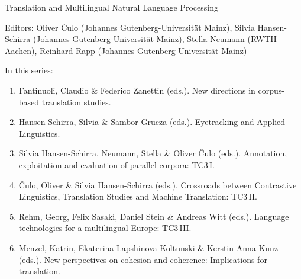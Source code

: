 {\large Translation and Multilingual Natural Language Processing}

\bigskip

Editors: Oliver \v{C}ulo (Johannes Gutenberg-Universität Mainz),
Silvia Hansen-Schirra (Johannes Gutenberg-Universität Mainz), 
Stella Neumann (RWTH Aachen),
Reinhard Rapp (Johannes Gutenberg-Universität Mainz)

\bigskip

In this series:

\begin{enumerate}
\item Fantinuoli, Claudio \& Federico Zanettin (eds.). New directions in corpus-based translation studies.
\item Hansen-Schirra, Silvia \& Sambor Grucza (eds.). Eyetracking and Applied Linguistics.
\item Silvia Hansen-Schirra, Neumann, Stella \& Oliver Čulo (eds.). Annotation, exploitation and evaluation of parallel corpora: TC3\,I.
\item Čulo, Oliver  \& Silvia Hansen-Schirra (eds.). Crossroads between Contrastive Linguistics, Translation Studies and Machine Translation: TC3\,II.
\item Rehm, Georg, Felix Sasaki, Daniel Stein \& Andreas Witt (eds.). Language technologies for a multilingual Europe: TC3\,III.
\item Menzel, Katrin, Ekaterina Lapshinova-Koltunski \& Kerstin Anna Kunz  (eds.). New perspectives on cohesion and coherence: Implications for translation.
\end{enumerate}

 
